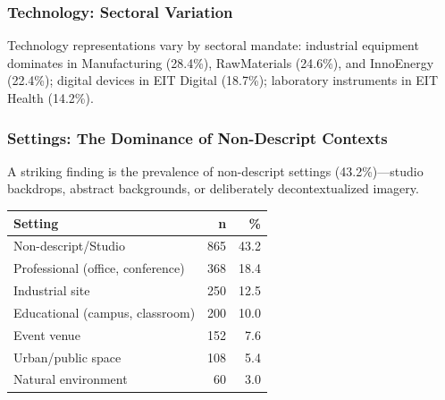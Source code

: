 \documentclass[../main.tex]{subfiles}
\begin{document}
\subsubsection{Technology: Sectoral Variation}

Technology representations vary by sectoral mandate: industrial equipment dominates in Manufacturing (28.4\%), RawMaterials (24.6\%), and InnoEnergy (22.4\%); digital devices in EIT Digital (18.7\%); laboratory instruments in EIT Health (14.2\%).


\subsubsection{Settings: The Dominance of Non-Descript Contexts}

A striking finding is the prevalence of non-descript settings (43.2\%)---studio backdrops, abstract backgrounds, or deliberately decontextualized imagery.

\begin{center}
\small
\begin{tabular}{lrr}
\toprule
\textbf{Setting} & \textbf{n} & \textbf{\%} \\
\midrule
Non-descript/Studio & 865 & 43.2 \\
Professional (office, conference) & 368 & 18.4 \\
Industrial site & 250 & 12.5 \\
Educational (campus, classroom) & 200 & 10.0 \\
Event venue & 152 & 7.6 \\
Urban/public space & 108 & 5.4 \\
Natural environment & 60 & 3.0 \\
\bottomrule
\end{tabular}
\end{center}
\end{document}
